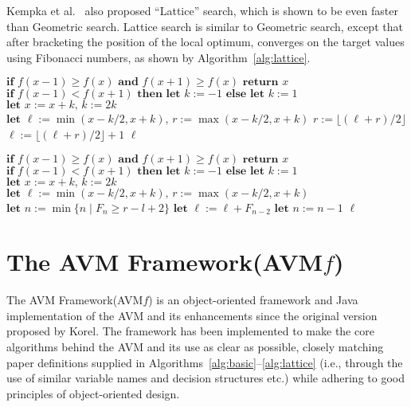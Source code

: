 \documentclass{llncs}
\newcommand{\longname}{AVM Framework\xspace}
\newcommand{\name}{AVM\hspace{-1pt}$f$\xspace}
\begin{document}
Kempka et al.~\cite{Kempka2015} also proposed ``Lattice'' search, which is shown to be even faster than Geometric search. Lattice search is similar to Geometric search, except that after bracketing the position of the local optimum, converges on the target values using Fibonacci numbers, as shown by Algorithm~\ref{alg:lattice}.

\begin{algorithm}[t]
	\footnotesize
	\caption{$\text{Geometric search, starting at }x\in D$}
	\begin{algorithmic}[1]
		\STATE$\textbf{if }f(x-1)\geq f(x)\textbf{ and }f(x+1)\geq f(x)\textbf{ return }x$
		\STATE$\textbf{if }f(x-1)<f(x+1)\textbf{ then let }k:=-1\textbf{ else let }k:=1$
			\STATE$\textbf{let }x:=x+k\text{, }k:=2k$
		\ENDWHILE
		\STATE$\textbf{let }\ell:=\min(x-k/2,x+k)\text{, }r:=\max(x-k/2,x+k)$
				\STATE$r:=\lfloor(\ell+r)/2\rfloor$
			\ELSE
				\STATE$\ell:=\lfloor(\ell+r)/2\rfloor+1$
			\ENDIF
		\ENDWHILE
		\RETURN$\ell$
	\end{algorithmic}
	\vspace*{1mm}
	\label{alg:geometric}
\end{algorithm}

\begin{algorithm}[t]
	\footnotesize
	\caption{$\text{Lattice search, starting at }x\in D$}
	\begin{algorithmic}[1]
		\STATE$\textbf{if }f(x-1)\geq f(x)\textbf{ and }f(x+1)\geq f(x)\textbf{ return }x$
		\STATE$\textbf{if }f(x-1)<f(x+1)\textbf{ then let }k:=-1\textbf{ else let }k:=1$
			\STATE$\textbf{let }x:=x+k\text{, }k:=2k$
		\ENDWHILE
		\STATE$\textbf{let }\ell:=\min(x-k/2,x+k)\text{, }r:=\max(x-k/2,x+k)$
		\STATE$\textbf{let }n:=\min\{n\mid F_{n}\geq r-l+2\}$
				\STATE$\textbf{let }\ell:=\ell+F_{n-2}$
			\ENDIF
			\STATE$\textbf{let }n:=n-1$
		\ENDWHILE
		\RETURN$\ell$
	\end{algorithmic}
	\vspace*{1mm}
	\label{alg:lattice}
\end{algorithm}



\section{The \longname (\name)}
\label{sec:avmf}
The \longname (\name) is an object-oriented framework and Java implementation of the AVM and its enhancements since the original version proposed by Korel.  The framework has been implemented to make the core algorithms behind the AVM and its use as clear as possible, closely matching paper definitions supplied in Algorithms~\ref{alg:basic}--\ref{alg:lattice} (i.e., through the use of similar variable names and decision structures etc.) while adhering to good principles of object-oriented design.
\end{document}
